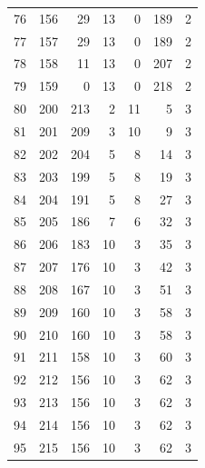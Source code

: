 \documentclass[a4paper,twoside,12pt]{book}
\begin{document}
\begin{appendices}
\begin{table}
\begin{tabular}{lrrrrrr}
		76  &    156 &        29 &        13 &               0 &             189 &         2 \\
		77  &    157 &        29 &        13 &               0 &             189 &         2 \\
		78  &    158 &        11 &        13 &               0 &             207 &         2 \\
		79  &    159 &         0 &        13 &               0 &             218 &         2 \\
		80  &    200 &       213 &         2 &              11 &               5 &         3 \\
		81  &    201 &       209 &         3 &              10 &               9 &         3 \\
		82  &    202 &       204 &         5 &               8 &              14 &         3 \\
		83  &    203 &       199 &         5 &               8 &              19 &         3 \\
		84  &    204 &       191 &         5 &               8 &              27 &         3 \\
		85  &    205 &       186 &         7 &               6 &              32 &         3 \\
		86  &    206 &       183 &        10 &               3 &              35 &         3 \\
		87  &    207 &       176 &        10 &               3 &              42 &         3 \\
		88  &    208 &       167 &        10 &               3 &              51 &         3 \\
		89  &    209 &       160 &        10 &               3 &              58 &         3 \\
		90  &    210 &       160 &        10 &               3 &              58 &         3 \\
		91  &    211 &       158 &        10 &               3 &              60 &         3 \\
		92  &    212 &       156 &        10 &               3 &              62 &         3 \\
		93  &    213 &       156 &        10 &               3 &              62 &         3 \\
		94  &    214 &       156 &        10 &               3 &              62 &         3 \\
		95  &    215 &       156 &        10 &               3 &              62 &         3 \\

\end{tabular}
\end{table}
\end{appendices}
\end{document}
